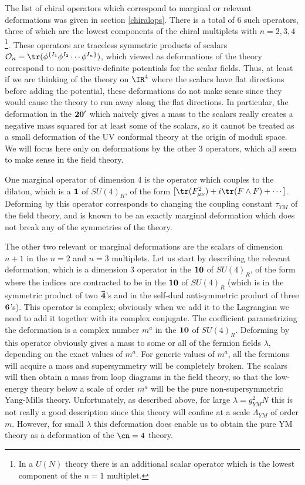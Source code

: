  The list of chiral operators which correspond to marginal or relevant
 deformations was given in section \ref{chiralops}. There is a total
 of 6 such operators, three of which are the lowest components of the
 chiral multiplets with $n=2,3,4$\footnote{In a $U(N)$ theory there is
 an additional scalar operator which is the lowest component of the
 $n=1$ multiplet.}. These operators are traceless
 symmetric products of scalars ${\cal O}_n=\tr(\phi^{\{I_1} \phi^{I_2}
 \cdots \phi^{I_n\}})$, which viewed as deformations of the theory
 correspond to non-positive-definite potentials for the scalar
 fields. Thus, at least if we are thinking of the theory on $\IR^4$
 where the scalars have flat directions before adding the potential,
 these deformations do not make sense since they would cause the
 theory to run away along the flat directions. In particular, the
 deformation in the $\bf 20'$ which naively gives a mass to the
 scalars really creates a negative mass squared for at least some of
 the scalars, so it cannot be treated as a small deformation of the UV
 conformal theory at the origin of moduli space. We will focus here
 only on deformations by the other 3 operators, which all seem to make
 sense in the field theory.

 One marginal operator of dimension 4 is the operator which couples to
 the dilaton, which is a $\bf 1$ of $SU(4)_R$, of the form $[\tr(F_{\mu
 \nu}^2) + i\tr(F \wedge F) + \cdots]$. Deforming by this operator
 corresponds to changing the coupling constant $\tau_{YM}$ of the field
 theory, and is known to be an exactly marginal deformation which does
 not break any of the symmetries of the theory.

 The other two relevant or marginal deformations are the scalars of
 dimension $n+1$ in the $n=2$ and $n=3$ multiplets. Let us start by
 describing the relevant deformation, which is a dimension 3 operator
 in the $\bf 10$ of $SU(4)_R$, of the form 
 where the indices are contracted to be in the $\bf 10$ of $SU(4)_R$
 (which is in the symmetric product of two $\bf {\bar 4}$'s and in the
 self-dual antisymmetric product of three $\bf 6$'s). This operator is
 complex; obviously when we add it to the Lagrangian we need to add it
 together with its complex conjugate. The coefficient
 parametrizing the deformation is a complex number $m^a$ in the $\bf
 10$ of $SU(4)_R$. Deforming by this operator obviously gives a mass
 to some or all of the fermion fields $\lambda$, depending on the
 exact values of $m^a$. For generic values of $m^a$, all the fermions
 will acquire a mass and supersymmetry will be completely broken. The
 scalars will then obtain a mass from loop diagrams in the field
 theory, so that the low-energy theory below a scale of order $m^a$
 will be the pure non-supersymmetric Yang-Mills theory. Unfortunately,
 as described above, for large $\lambda=g_{YM}^2 N$ this is not really
 a good description since this theory will confine at a scale
 $\Lambda_{YM}$ of order $m$. However, for small $\lambda$ this
 deformation does enable us to obtain the pure YM theory as a
 deformation of the $\cn=4$ theory.


